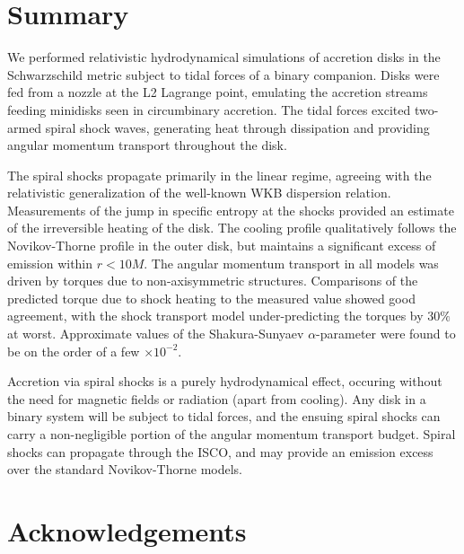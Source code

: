 \documentclass{emulateapj}
\newcommand{\al}{\alpha}
\begin{document}
\section{Summary}
\label{sec:summary}

We performed relativistic hydrodynamical simulations of accretion disks in the Schwarzschild metric subject to tidal forces of a binary companion.  Disks were fed from a nozzle at the L2 Lagrange point, emulating the accretion streams feeding minidisks seen in circumbinary accretion.  The tidal forces excited two-armed spiral shock waves,  generating heat through dissipation and providing angular momentum transport throughout the disk.

The spiral shocks propagate primarily in the linear regime, agreeing with the relativistic generalization of the well-known WKB dispersion relation.  Measurements of the jump in specific entropy at the shocks provided an estimate of the irreversible heating of the disk.  The cooling profile qualitatively follows the Novikov-Thorne profile in the outer disk, but maintains a significant excess of emission within $r < 10 M$.  The angular momentum transport in all models was driven by torques due to non-axisymmetric structures.  Comparisons of the predicted torque due to shock heating to the measured value showed good agreement, with the shock transport model under-predicting the torques by $30\%$ at worst.  Approximate values of the Shakura-Sunyaev $\al$-parameter were found to be on the order of a few $\times 10^{-2}$.

Accretion via spiral shocks is a purely hydrodynamical effect, occuring without the need for magnetic fields or radiation (apart from cooling).  Any disk in a binary system will be subject to tidal forces, and the ensuing spiral shocks can carry a non-negligible portion of the angular momentum transport budget.  Spiral shocks can propagate through the ISCO, and may provide an emission excess over the standard Novikov-Thorne models.


\section{Acknowledgements}


\newpage





%
\end{document}

